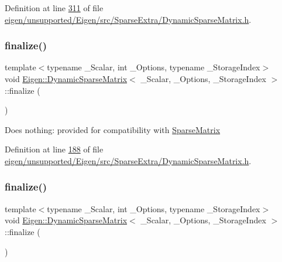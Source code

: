 Definition at line \hyperlink{eigen_2unsupported_2_eigen_2src_2_sparse_extra_2_dynamic_sparse_matrix_8h_source_l00311}{311} of file \hyperlink{eigen_2unsupported_2_eigen_2src_2_sparse_extra_2_dynamic_sparse_matrix_8h_source}{eigen/unsupported/\+Eigen/src/\+Sparse\+Extra/\+Dynamic\+Sparse\+Matrix.\+h}.

\mbox{\label{class_eigen_1_1_dynamic_sparse_matrix_aa0abc0e4565143f103f0d7373bd4a125}} 
\subsubsection{\texorpdfstring{finalize()}{finalize()}\hspace{0.1cm}{\footnotesize\ttfamily [1/2]}}
{\footnotesize\ttfamily template$<$typename \+\_\+\+Scalar, int \+\_\+\+Options, typename \+\_\+\+Storage\+Index$>$ \\
void \hyperlink{class_eigen_1_1_dynamic_sparse_matrix}{Eigen\+::\+Dynamic\+Sparse\+Matrix}$<$ \+\_\+\+Scalar, \+\_\+\+Options, \+\_\+\+Storage\+Index $>$\+::finalize (\begin{DoxyParamCaption}{ }\end{DoxyParamCaption})\hspace{0.3cm}{\ttfamily [inline]}}

Does nothing\+: provided for compatibility with \hyperlink{group___sparse_core___module_class_eigen_1_1_sparse_matrix}{Sparse\+Matrix} 

Definition at line \hyperlink{eigen_2unsupported_2_eigen_2src_2_sparse_extra_2_dynamic_sparse_matrix_8h_source_l00188}{188} of file \hyperlink{eigen_2unsupported_2_eigen_2src_2_sparse_extra_2_dynamic_sparse_matrix_8h_source}{eigen/unsupported/\+Eigen/src/\+Sparse\+Extra/\+Dynamic\+Sparse\+Matrix.\+h}.

\mbox{\label{class_eigen_1_1_dynamic_sparse_matrix_aa0abc0e4565143f103f0d7373bd4a125}} 
\subsubsection{\texorpdfstring{finalize()}{finalize()}\hspace{0.1cm}{\footnotesize\ttfamily [2/2]}}
{\footnotesize\ttfamily template$<$typename \+\_\+\+Scalar, int \+\_\+\+Options, typename \+\_\+\+Storage\+Index$>$ \\
void \hyperlink{class_eigen_1_1_dynamic_sparse_matrix}{Eigen\+::\+Dynamic\+Sparse\+Matrix}$<$ \+\_\+\+Scalar, \+\_\+\+Options, \+\_\+\+Storage\+Index $>$\+::finalize (\begin{DoxyParamCaption}{ }\end{DoxyParamCaption})\hspace{0.3cm}{\ttfamily [inline]}}

